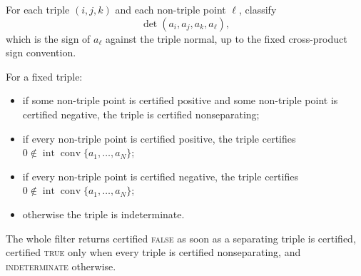 \begin{algorithm}
\label{alg:f64-origin-interior-triple-filter}
For each triple $(i,j,k)$ and each non-triple point $\ell$, classify
\[
  \det(a_i,a_j,a_k,a_\ell),
\]
which is the sign of $a_\ell$ against the triple normal, up to the fixed
cross-product sign convention.

For a fixed triple:
\begin{itemize}
\item if some non-triple point is certified positive and some non-triple point
  is certified negative, the triple is certified nonseparating;
\item if every non-triple point is certified positive, the triple certifies
  $0\notin\operatorname{int}\operatorname{conv}\{a_1,\ldots,a_N\}$;
\item if every non-triple point is certified negative, the triple certifies
  $0\notin\operatorname{int}\operatorname{conv}\{a_1,\ldots,a_N\}$;
\item otherwise the triple is indeterminate.
\end{itemize}
The whole filter returns certified \textsc{false} as soon as a separating
triple is certified, certified \textsc{true} only when every triple is
certified nonseparating, and \textsc{indeterminate} otherwise.
\end{algorithm}

